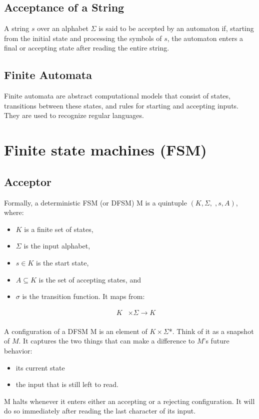 \documentclass[hidelinks,12pt]{article}
\begin{document}
\subsection{Acceptance of a String}
A string $s$ over an alphabet $\Sigma$ is said to be accepted by an automaton
if, starting from the initial state and processing the symbols of $s$, the
automaton enters a final or accepting state after reading the entire string.

\subsection{Finite Automata}
Finite automata are abstract computational models that consist of states,
transitions between these states, and rules for starting and accepting inputs.
They are used to recognize regular languages.


\section{Finite state machines (FSM)}

\subsection{Acceptor}

Formally, a deterministic FSM (or DFSM) M is a quintuple $(K, \Sigma, , s, A)$,
where: 



\begin{itemize} 
\item $K$ is a finite set of states,
\item $\Sigma$ is the input alphabet, 
\item $s \in K$ is the start state, 
\item $A \subseteq K$ is the set of accepting states, and 
\item $\sigma$ is the transition function. It maps from:

		\begin{align*} K &\times \Sigma \to K \\ \end{align*}

\end{itemize}

A configuration of a DFSM M is an element of $K \times \Sigma$*. Think of it as a snapshot
of $M$. It captures the two things that can make a difference to $M$’s future
behavior:
\begin{itemize}
		\item its current state 
		\item the input that is still left to read.
\end{itemize}
M halts whenever it enters either an accepting or a rejecting configuration. It
will do so immediately after reading the last character of its input.
\end{document}
